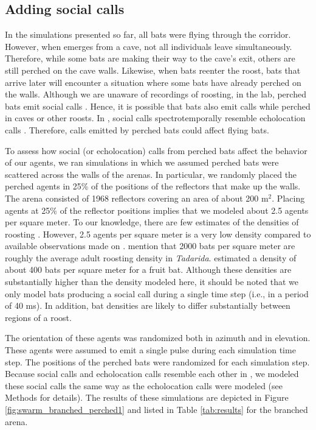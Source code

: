 \documentclass[a4paper, 11pt]{article}
\begin{document}
%
%

\subsection{Adding social calls} 

In the simulations presented so far, all bats were flying through the corridor. However, when  emerges from a cave, not all individuals leave simultaneously. Therefore, while some bats are making their way to the cave's exit, others are still perched on the cave walls. Likewise, when bats reenter the roost, bats that arrive later will encounter a situation where some bats have already perched on the walls. Although we are unaware of recordings of  roosting, in the lab, perched bats emit social calls \citep{Schwartz2007}. Hence, it is possible that bats also emit calls while perched in caves or other roosts. In , social calls spectrotemporally resemble echolocation calls \citep{Gillam2010,Schwartz2007}. Therefore, calls emitted by perched bats could affect flying bats.

To assess how social (or echolocation) calls from perched bats affect the behavior of our agents, we ran simulations in which we assumed perched bats were scattered across the walls of the arenas. In particular, we randomly placed the perched agents in 25\% of the positions of the reflectors that make up the walls. The arena consisted of 1968 reflectors covering an area of about 200 m$^2$. Placing agents at 25\% of the reflector positions implies that we modeled about 2.5 agents per square meter. To our knowledge, there are few estimates of the densities of roosting . However, 2.5 agents per square meter is a very low density compared to available observations made on . \citet{Tuttle2005} mention that 2000 bats per square meter are roughly the average adult roosting density in \textit{Tadarida}. \citet{Carpenter2014} estimated a density of about 400 bats per square meter for a fruit bat. Although these densities are substantially higher than the density modeled here, it should be noted that we only model bats producing a social call during a single time step (i.e., in a period of 40 ms). In addition, bat densities are likely to differ substantially between regions of a roost.

The orientation of these agents was randomized both in azimuth and in elevation. These agents were assumed to emit a single pulse during each simulation time step. The positions of the perched bats were randomized for each simulation step. Because social calls and echolocation calls resemble each other in , we modeled these social calls the same way as the echolocation calls were modeled (see Methods for details). The results of these simulations are depicted in Figure \ref{fig:swarm_branched_perched1} and listed in Table \ref{tab:results} for the branched arena.
\end{document}
